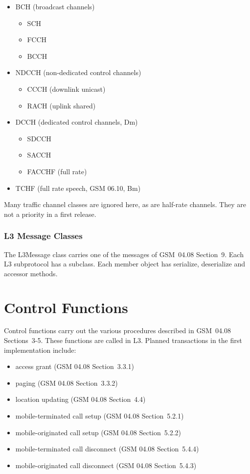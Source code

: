 \documentclass[11pt]{book}
\begin{document}
\begin{itemize}
	\item BCH (broadcast channels)
	\begin{itemize}
		\item SCH
		\item FCCH
		\item BCCH
	\end{itemize}
	\item NDCCH (non-dedicated control channels)
	\begin{itemize}
		\item CCCH (downlink unicast)
		\item RACH (uplink shared)
	\end{itemize}
	\item DCCH (dedicated control channels, Dm)
	\begin{itemize}
		\item SDCCH
		\item SACCH
		\item FACCHF (full rate)
	\end{itemize}
	\item TCHF (full rate speech, GSM 06.10, Bm)
\end{itemize}

Many traffic channel classes are ignored here, as are half-rate channels.
They are not a priority in a first release.

\subsubsection{L3 Message Classes}
The L3Message class carries one of the messages of GSM~04.08 Section~9.  Each L3 subprotocol has a subclass.  Each member object has serialize, deserialize and accessor methods.



\section{Control Functions}
Control functions carry out the various procedures described in GSM~04.08 Sections~3-5. These functions are called in L3.  Planned transactions in the first implementation include:
\begin{itemize}
	\item access grant (GSM 04.08 Section~3.3.1)
	\item paging (GSM 04.08 Section~3.3.2)
	\item location updating (GSM 04.08 Section~4.4)
	\item mobile-terminated call setup (GSM 04.08 Section~5.2.1)
	\item mobile-originated call setup (GSM 04.08 Section~5.2.2)
	\item mobile-terminated call disconnect (GSM 04.08 Section~5.4.4)
	\item mobile-originated call disconnect (GSM 04.08 Section~5.4.3)
\end{itemize}
\end{document}
